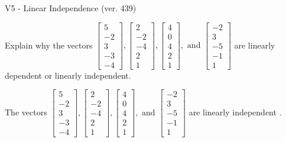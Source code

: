 \begin{exercise}
  \begin{exerciseTitle}V5 - Linear Independence (ver. 439)\end{exerciseTitle}
  \begin{exerciseStatement}
    Explain why the vectors \(\left[\begin{array}{r}
5 \\
-2 \\
3 \\
-3 \\
-4
\end{array}\right] , \left[\begin{array}{r}
2 \\
-2 \\
-4 \\
2 \\
1
\end{array}\right] , \left[\begin{array}{r}
4 \\
0 \\
4 \\
2 \\
1
\end{array}\right] , \text{ and } \left[\begin{array}{r}
-2 \\
3 \\
-5 \\
-1 \\
1
\end{array}\right]\) are linearly dependent or linearly independent.	


  \end{exerciseStatement}
  \begin{exerciseAnswer}
   The vectors \(\left[\begin{array}{r}
5 \\
-2 \\
3 \\
-3 \\
-4
\end{array}\right] , \left[\begin{array}{r}
2 \\
-2 \\
-4 \\
2 \\
1
\end{array}\right] , \left[\begin{array}{r}
4 \\
0 \\
4 \\
2 \\
1
\end{array}\right] , \text{ and } \left[\begin{array}{r}
-2 \\
3 \\
-5 \\
-1 \\
1
\end{array}\right]\) are 
  	 linearly independent  .
  


  \end{exerciseAnswer}
\end{exercise}